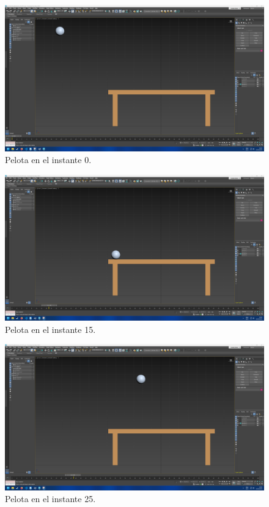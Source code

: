 \documentclass{article}
\begin{document}
\begin{figure}[H]
    \centering
    \includegraphics[width=\textwidth]{imagenes/Ejercicio3/keyframes/0.png}
    \caption{Pelota en el instante 0.}
\end{figure}
\begin{figure}[H]
    \centering
    \includegraphics[width=\textwidth]{imagenes/Ejercicio3/keyframes/15.png}
    \caption{Pelota en el instante 15.}
\end{figure}
\begin{figure}[H]
    \centering
    \includegraphics[width=\textwidth]{imagenes/Ejercicio3/keyframes/25.png}
    \caption{Pelota en el instante 25.}
\end{figure}
\end{document}
